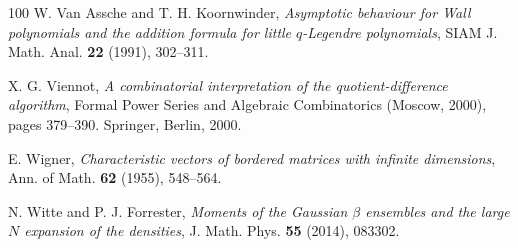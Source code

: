 \documentclass{amsart}
\theoremstyle{plain}
\theoremstyle{remark}
\numberwithin{equation}{section}
\begin{document}
\begin{thebibliography}{100}
 W. Van Assche and T. H. Koornwinder, \emph{Asymptotic behaviour for Wall polynomials and the addition formula for little $q$-Legendre polynomials}, SIAM J. Math. Anal. \textbf{22} (1991), 302--311.

 X. G. Viennot, \emph{A combinatorial interpretation of the quotient-difference algorithm}, Formal Power Series and Algebraic Combinatorics (Moscow, 2000), pages 379--390. Springer, Berlin, 2000.

 E. Wigner, \emph{Characteristic vectors of bordered matrices with infinite dimensions}, Ann. of Math. \textbf{62} (1955), 548--564.

 N. Witte and P. J. Forrester, \emph{Moments of the Gaussian $\beta$ ensembles and the large $N$ expansion of the densities}, J. Math. Phys. \textbf{55} (2014), 083302. 

\end{thebibliography}
\end{document}
